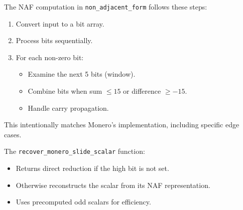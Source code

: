 The NAF computation in \texttt{non\_adjacent\_form} follows these steps:
\begin{enumerate}
  \item Convert input to a bit array.  %
  \item Process bits sequentially.  %
  \item For each non-zero bit: %
    \begin{itemize}
      \item Examine the next 5 bits (window).  %
      \item Combine bits when sum $\leq 15$ or difference $\geq -15$.  %
      \item Handle carry propagation.  %
    \end{itemize}
\end{enumerate}

This intentionally matches Monero's implementation, including specific edge cases.

The \texttt{recover\_monero\_slide\_scalar} function:
\begin{itemize}
  \item Returns direct reduction if the high bit is not set.  %
  \item Otherwise reconstructs the scalar from its NAF representation.  %
  \item Uses precomputed odd scalars for efficiency.  %
\end{itemize}

